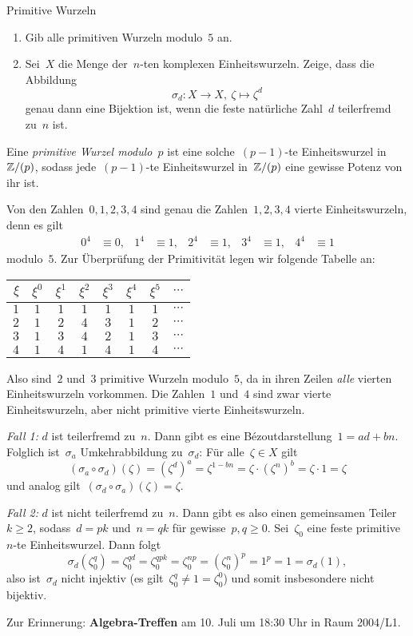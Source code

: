 \documentclass{algblatt}
\begin{document}
\begin{aufgabe}{Primitive Wurzeln}
\begin{enumerate}
\item Gib alle primitiven Wurzeln modulo~$5$ an.

\item Sei~$X$ die Menge der~$n$-ten komplexen Einheitswurzeln. Zeige, dass die
Abbildung
\[ \sigma_d : X \longrightarrow X,\ \zeta \longmapsto \zeta^d \]
genau dann eine Bijektion ist, wenn die feste natürliche Zahl~$d$ teilerfremd
zu~$n$ ist.
\end{enumerate}

\begin{loesungE}
\item Eine \emph{primitive Wurzel modulo~$p$} ist eine solche~$(p-1)$-te
Einheitswurzel in~$\mathbb{Z}/(p)$, sodass jede~$(p-1)$-te Einheitswurzel in~$\mathbb{Z}/(p)$
eine gewisse Potenz von ihr ist.

Von den Zahlen~$0,1,2,3,4$ sind genau die Zahlen~$1,2,3,4$ vierte
Einheitswurzeln, denn es gilt
\begin{align*}
  0^4 &\equiv 0, & 1^4 &\equiv 1, & 2^4 &\equiv 1, & 3^4 &\equiv 1, &
  4^4 &\equiv 1
\end{align*}
modulo~$5$. Zur Überprüfung der Primitivität legen wir folgende Tabelle an:
\begin{center}
  \begin{tabular}{r|c|c|c|c|c|c|c}
    $\xi$ & $\xi^0$ & $\xi^1$ & $\xi^2$ & $\xi^3$ & $\xi^4$ & $\xi^5$ & $\cdots$ \\\hline
    $1$ & $1$ & $1$ & $1$ & $1$ & $1$ & $1$ & $\cdots$ \\
    $2$ & $1$ & $2$ & $4$ & $3$ & $1$ & $2$ & $\cdots$ \\
    $3$ & $1$ & $3$ & $4$ & $2$ & $1$ & $3$ & $\cdots$ \\
    $4$ & $1$ & $4$ & $1$ & $4$ & $1$ & $4$ & $\cdots$
  \end{tabular}
\end{center}
Also sind~$2$ und~$3$ primitive Wurzeln modulo~$5$, da in ihren Zeilen
\emph{alle} vierten Einheitswurzeln vorkommen. Die Zahlen~$1$ und~$4$ sind zwar
vierte Einheitswurzeln, aber nicht primitive vierte Einheitswurzeln.

\item \emph{Fall 1:} $d$ ist teilerfremd zu~$n$. Dann gibt es eine
Bézoutdarstellung~$1 = ad + bn$. Folglich ist~$\sigma_a$ Umkehrabbildung
zu~$\sigma_d$: Für alle~$\zeta \in X$ gilt
\[ (\sigma_a \circ \sigma_d)(\zeta) =
  (\zeta^d)^a = \zeta^{1 - bn} = \zeta \cdot (\zeta^n)^b = \zeta \cdot 1 =
  \zeta \]
und analog gilt~$(\sigma_d \circ \sigma_a)(\zeta) = \zeta$.

\emph{Fall 2:} $d$ ist nicht teilerfremd zu~$n$. Dann gibt es also einen
gemeinsamen Teiler~$k \geq 2$, sodass~$d = pk$ und~$n = qk$ für gewisse~$p,q
\geq 0$. Sei~$\zeta_0$ eine feste primitive~$n$-te Einheitswurzel. Dann folgt
\[ \sigma_d(\zeta_0^q) = \zeta_0^{qd} = \zeta_0^{qpk} = \zeta_0^{np} =
(\zeta_0^n)^p = 1^p = 1 = \sigma_d(1), \]
also ist~$\sigma_d$ nicht injektiv (es gilt~$\zeta_0^q \neq 1 = \zeta_0^0$) und
somit insbesondere nicht bijektiv.
\end{loesungE}
\end{aufgabe}

Zur Erinnerung: \textbf{Algebra-Treffen} am 10. Juli um 18:30 Uhr in Raum
2004/L1.
\end{document}

